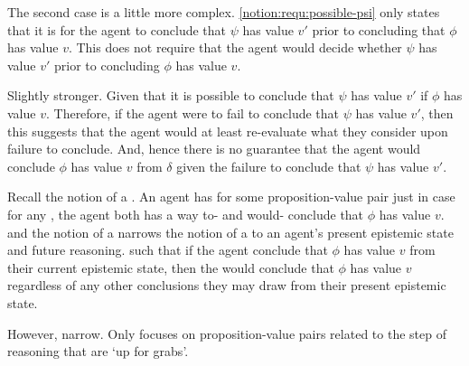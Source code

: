 \begin{note}
  The second case is a little more complex.
  \ref{notion:requ:possible-psi} only states that it is \epVAd{} for the agent to conclude that \(\psi\) has value \(v'\) prior to concluding that \(\phi\) has value \(v\).
  This does not require that the agent would decide whether \(\psi\) has value \(v'\) prior to concluding \(\phi\) has value \(v\).
  


  Slightly stronger.
  Given that it is possible to conclude that \(\psi\) has value \(v'\) if \(\phi\) has value \(v\).
  Therefore, if the agent were to fail to conclude that \(\psi\) has value \(v'\), then this suggests that the agent would at least re-evaluate what they consider \epVAd{} upon failure to conclude.
  And, hence there is no guarantee that the agent would conclude \(\phi\) has value \(v\) from \(\delta\) given the failure to conclude that \(\psi\) has value \(v'\).

  
\end{note}



\begin{note}[\sink{3}]
  Recall the notion of a \sink{}.
  An agent has \support{} for some proposition-value pair just in case for any \epPW{}, the agent both has a way to- and would- conclude that \(\phi\) has value \(v\).
  \ideaCS{} and the notion of a \requ{} narrows the notion of a \sink{} to an agent's present epistemic state and future reasoning.
  such that if the agent conclude that \(\phi\) has value \(v\) from their current epistemic state, then the would conclude that \(\phi\) has value \(v\) regardless of any other conclusions they may draw from their present epistemic state.

  However, narrow.
  Only focuses on proposition-value pairs related to the step of reasoning that are `up for grabs'.
\end{note}

